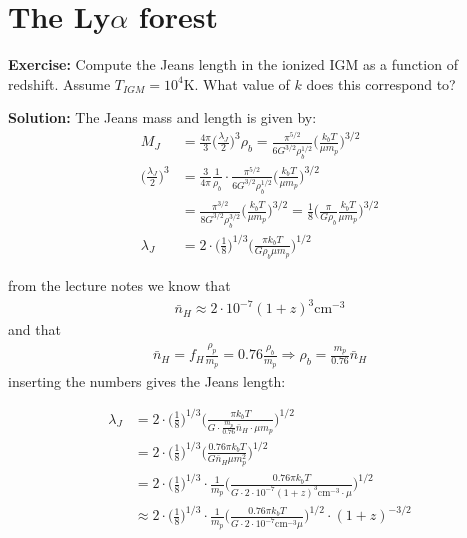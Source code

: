 \documentclass[paper=a4, fontsize=11pt]{scrartcl} %
\numberwithin{figure}{section} %
\numberwithin{table}{section} %
\begin{document}

\section{The Ly$\alpha$ forest}

\textbf{Exercise:} Compute the Jeans length in the ionized IGM as a function of redshift. Assume $T_{IGM} = 10^4$K. What value of $k$ does this correspond to?

\textbf{Solution:} The Jeans mass and length is given by:
\begin{align*}
M_J &= \frac{4\pi}{3} \Bigg( \frac{\lambda_J}{2} \Bigg)^3 \rho_b = \frac{\pi^{5/2}}{6G^{3/2}\rho_b^{1/2}} \Bigg( \frac{k_bT}{\mu m_p} \Bigg)^{3/2} \\
\Bigg( \frac{\lambda_J}{2} \Bigg)^3 &= \frac{3}{4\pi}\frac{1}{\rho_b} \cdot \frac{\pi^{5/2}}{6G^{3/2}\rho_b^{1/2}} \Bigg( \frac{k_bT}{\mu m_p} \Bigg)^{3/2} \\
&= \frac{\pi^{3/2}}{8G^{3/2}\rho_b^{3/2}} \Bigg( \frac{k_bT}{\mu m_p} \Bigg)^{3/2} = \frac{1}{8} \Bigg(\frac{\pi}{G\rho_b}  \frac{k_bT}{\mu m_p} \Bigg)^{3/2}  \\
\lambda_J &= 2\cdot \Bigg( \frac{1}{8} \Bigg)^{1/3} \Bigg( \frac{\pi k_bT}{G\rho_b\mu m_p} \Bigg)^{1/2}
\end{align*}

from the lecture notes we know that
\begin{align*}
\bar{n}_H \approx 2 \cdot 10^{-7} (1 + z)^3 \mathrm{cm}^{-3}
\end{align*}
and that
\begin{align*}
\bar{n}_H  = f_H\frac{\rho_p}{m_p} = 0.76 \frac{\rho_b}{m_p} \Rightarrow \rho_b = \frac{m_p}{0.76}\bar{n}_H 
\end{align*}
inserting the numbers gives the Jeans length:

\begin{align*}
\lambda_J &= 2\cdot \Bigg( \frac{1}{8} \Bigg)^{1/3} \Bigg( \frac{\pi k_bT}{G \cdot \frac{m_p}{0.76}\bar{n}_H \cdot \mu m_p} \Bigg)^{1/2} \\
&= 2\cdot \Bigg( \frac{1}{8} \Bigg)^{1/3} \Bigg( \frac{0.76\pi k_bT}{G \bar{n}_H  \mu m_p^2} \Bigg)^{1/2} \\
&= 2\cdot \Bigg( \frac{1}{8} \Bigg)^{1/3} \cdot \frac{1}{m_p} \Bigg( \frac{0.76\pi k_bT }{G \cdot 2 \cdot 10^{-7} (1 + z)^3 \mathrm{cm}^{-3} \cdot  \mu} \Bigg)^{1/2} \\
&\approx 2\cdot \Bigg( \frac{1}{8} \Bigg)^{1/3} \cdot \frac{1}{m_p} \Bigg( \frac{0.76\pi k_bT }{G\cdot 2 \cdot 10^{-7}  \mathrm{cm}^{-3}  \mu} \Bigg)^{1/2} \cdot (1 + z)^{-3/2} \\
\end{align*}
\end{document}
